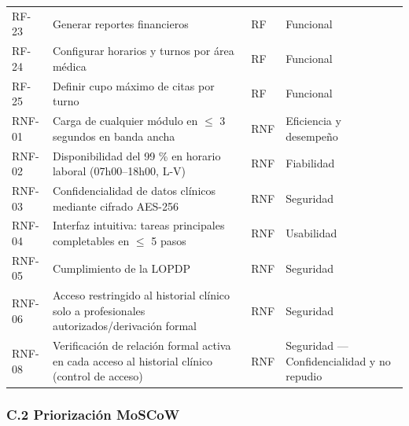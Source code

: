 \documentclass[11pt,a4paper]{article}
\begin{document}
\begin{longtable}{p{} p{} p{} p{}}
		RF-23 & Generar reportes financieros & RF & Funcional \\
		RF-24 & Configurar horarios y turnos por área médica & RF & Funcional \\
		RF-25 & Definir cupo máximo de citas por turno & RF & Funcional \\
		RNF-01 & Carga de cualquier módulo en \(\leq\) 3 segundos en banda ancha & RNF & Eficiencia y desempeño \\
		RNF-02 & Disponibilidad del 99 \% en horario laboral (07h00--18h00, L-V) & RNF & Fiabilidad \\
		RNF-03 & Confidencialidad de datos clínicos mediante cifrado AES-256 & RNF & Seguridad \\
		RNF-04 & Interfaz intuitiva: tareas principales completables en \(\leq\) 5 pasos & RNF & Usabilidad \\
		RNF-05 & Cumplimiento de la LOPDP & RNF & Seguridad \\
		RNF-06 & Acceso restringido al historial clínico solo a profesionales autorizados/derivación formal & RNF & Seguridad \\
		RNF-08 & Verificación de relación formal activa en cada acceso al historial clínico (control de acceso) & RNF & Seguridad --- Confidencialidad y no repudio \\
		
		
		
	\end{longtable}
	
	
	\subsubsection{C.2 Priorización MoSCoW}
	
\end{document}
